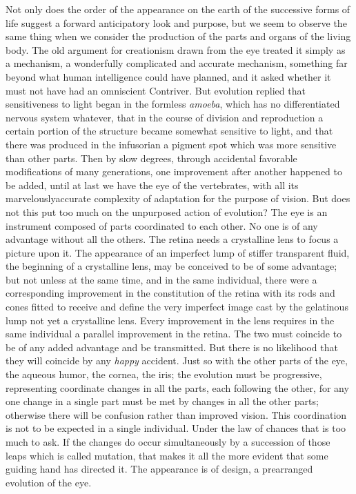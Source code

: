 Not only does the order of the appearance on the earth of the successive forms of life suggest
a forward anticipatory look and purpose, but we seem to observe the same thing when we
consider the production of the parts and organs of the living body. The old argument for
creationism drawn from the eye treated it simply as a mechanism, a wonderfully complicated
and accurate mechanism, something far beyond what human intelligence could have planned,
and it asked whether it must not have had an omniscient Contriver. But evolution replied that
sensitiveness to light began in the formless \textit{amoeba}, which has no differentiated nervous
system whatever, that in the course of division and reproduction a certain portion of the
structure became somewhat sensitive to light, and that there was produced in the infusorian a
pigment spot which was more sensitive than other parts. Then by slow degrees, through
accidental favorable modifications of many generations, one improvement after another
happened to be added, until at last we have the eye of the vertebrates, with all its marvelouslyaccurate complexity of adaptation for the purpose of vision. But does not this put too much
on the unpurposed action of evolution? The eye is an instrument composed of parts
coordinated to each other. No one is of any advantage without all the others. The retina needs
a crystalline lens to focus a picture upon it. The appearance of an imperfect lump of stiffer
transparent fluid, the beginning of a crystalline lens, may be conceived to be of some
advantage; but not unless at the same time, and in the same individual, there were a
corresponding improvement in the constitution of the retina with its rods and cones fitted to
receive and define the very imperfect image cast by the gelatinous lump not yet a crystalline
lens. Every improvement in the lens requires in the same individual a parallel improvement
in the retina. The two must coincide to be of any added advantage and be transmitted. But
there is no likelihood that they will coincide by any \textit{happy} accident. Just so with the other
parts of the eye, the aqueous humor, the cornea, the iris; the evolution must be progressive,
representing coordinate changes in all the parts, each following the other, for any one change
in a single part must be met by changes in all the other parts; otherwise there will be
confusion rather than improved vision. This coordination is not to be expected in a single
individual. Under the law of chances that is too much to ask. If the changes do occur
simultaneously by a succession of those leaps which is called mutation, that makes it all the
more evident that some guiding hand has directed it. The appearance is of design, a
prearranged evolution of the eye.

